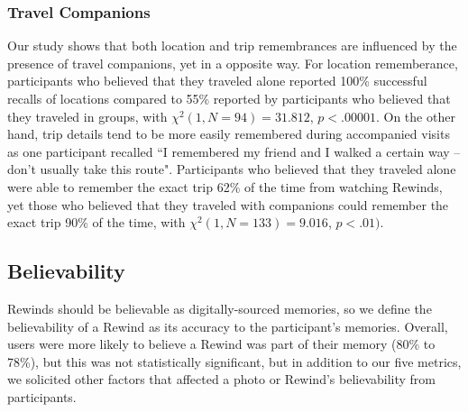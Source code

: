\documentclass{sigchi}
\begin{document}
\subsubsection{Travel Companions}
Our study shows that both location and trip remembrances are influenced by the presence of travel companions, yet in a opposite way. For location rememberance, participants who believed that they traveled alone reported 100\% successful recalls of locations compared to 55\% reported by participants who believed that they traveled in groups, with $\chi^2(1, N=94) = 31.812$, $p <.00001$. On the other hand, trip details tend to be more easily remembered during accompanied visits as one participant recalled ``I remembered my friend and I walked a certain way -- don't usually take this route". Participants who believed that they traveled alone were able to remember the exact trip 62\% of the time from watching Rewinds, yet those who believed that they traveled with companions could remember the exact trip 90\% of the time, with $\chi^2(1, N=133) = 9.016$, $p <.01)$.




\subsection{Believability}
Rewinds should be believable as digitally-sourced memories, so we define the believability of a Rewind as its accuracy to the participant's memories.
Overall, users were more likely to believe a Rewind was part of their memory (80\% to 78\%), but this was not statistically significant,
but in addition to our five metrics, we solicited other factors that affected a photo or Rewind's believability from participants.
\end{document}
